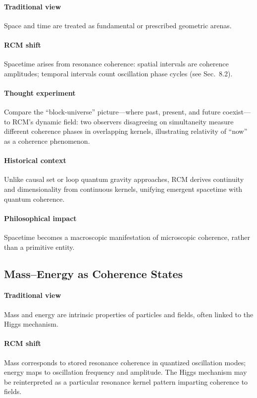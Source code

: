 \paragraph{Traditional view}  
Space and time are treated as fundamental or prescribed geometric arenas.

\paragraph{RCM shift}  
Spacetime arises from resonance coherence: spatial intervals are coherence amplitudes; temporal intervals count oscillation phase cycles (see Sec.~8.2).

\paragraph{Thought experiment}  
Compare the “block-universe” picture—where past, present, and future coexist—to RCM’s dynamic field: two observers disagreeing on simultaneity measure different coherence phases in overlapping kernels, illustrating relativity of “now” as a coherence phenomenon.

\paragraph{Historical context}  
Unlike causal set or loop quantum gravity approaches, RCM derives continuity and dimensionality from continuous kernels, unifying emergent spacetime with quantum coherence.

\paragraph{Philosophical impact}  
Spacetime becomes a macroscopic manifestation of microscopic coherence, rather than a primitive entity.

\subsection*{Mass–Energy as Coherence States}

\paragraph{Traditional view}  
Mass and energy are intrinsic properties of particles and fields, often linked to the Higgs mechanism.

\paragraph{RCM shift}  
Mass corresponds to stored resonance coherence in quantized oscillation modes; energy maps to oscillation frequency and amplitude. The Higgs mechanism may be reinterpreted as a particular resonance kernel pattern imparting coherence to fields.

